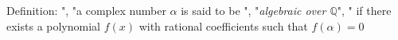\documentclass[preview]{standalone}
\begin{document}
\begin{center}
Definition: ", "a complex number $\alpha$ is said to be ", "\textit{algebraic over $\mathbb{Q}$}", " if there exists a polynomial $f(x)$ with rational coefficients such that $f(\alpha) = 0$
\end{center}
\end{document}
